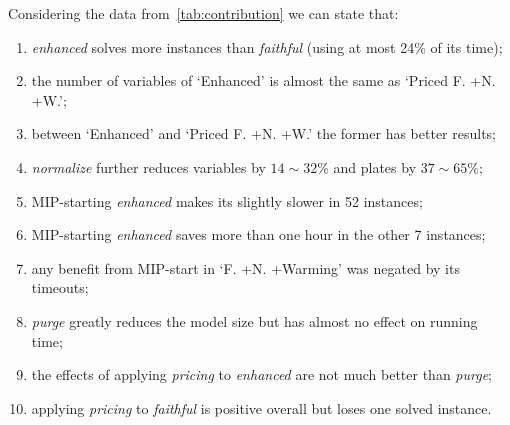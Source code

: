 \documentclass[smallextended]{svjour3}       %
\begin{document}
Considering the data from~\autoref{tab:contribution} we can state that:
\begin{enumerate}
\item \emph{enhanced} solves more instances than \emph{faithful} (using at most 24\% of its time);
\item the number of variables of `Enhanced' is almost the same as `Priced F. +N. +W.';
\item between `Enhanced' and `Priced F. +N. +W.' the former has better results;
\item \emph{normalize} further reduces variables by \(14\sim32\)\% and plates by \(37\sim65\)\%;
\item MIP-starting \emph{enhanced} makes its slightly slower in 52 instances;
\item MIP-starting \emph{enhanced} saves more than one hour in the other 7 instances;
\item any benefit from MIP-start in `F. +N. +Warming' was negated by its timeouts;
\item \emph{purge} greatly reduces the model size but has almost no effect on running time;
\item the effects of applying \emph{pricing} to \emph{enhanced} are not much better than \emph{purge};
\item applying \emph{pricing} to \emph{faithful} is positive overall but loses one solved instance.
\end{enumerate}
\end{document}
